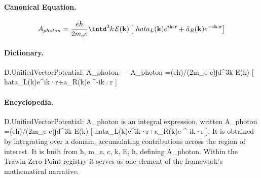 \paragraph{Canonical Equation.}
\[
A_{photon} =\frac{e\hbar}{2m_e c}\intd^3k\,\mathcal{E}(\mathbf{k})\left[\ hat{a}_L(\mathbf{k})e^{i\mathbf{k}\cdot\mathbf{r}}+\hat{a}_R(\mathbf{k})e ^{-i\mathbf{k}\cdot\mathbf{r}}\right]
\]

\paragraph{Dictionary.}
D.UnifiedVectorPotential: A\_photon — A\_photon =(eħ)/(2m\_e c)∫d\textasciicircum{}3k E(k) [ hata\_L(k)e\textasciicircum{}ik·r+a\_R(k)e \textasciicircum{}-ik·r ]

\paragraph{Encyclopedia.}
D.UnifiedVectorPotential: A\_photon is an integral expression, written A\_photon =(eħ)/(2m\_e c)∫d\textasciicircum{}3k E(k) [ hata\_L(k)e\textasciicircum{}ik·r+a\_R(k)e \textasciicircum{}-ik·r ]. It is obtained by integrating over a domain, accumulating contributions across the region of interest. It is built from ħ, m\_e, c, k, E, h, defining A\_photon. Within the Trawin Zero Point registry it serves as one element of the framework's mathematical narrative.
